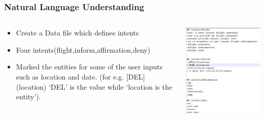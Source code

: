  \begin{frame}[fragile]\frametitle{Natural Language Understanding}
 
    \begin{columns}
    \begin{column}[t]{0.5\linewidth}
\begin{itemize}
\item Create a Data file which defines intents
\item Four intents(flight,inform,affirmation,deny)
\item Marked the entities for some of the user inputs such as location and date. (for e.g. [DEL](location) ‘DEL’ is the value while ‘location is the entity’).
\end{itemize}
\end{column}
    \begin{column}[t]{0.5\linewidth}
\begin{center}
\includegraphics[width=\linewidth,keepaspectratio]{images/mmt1}
\end{center}
\end{column}
\end{columns}
\end{frame}

